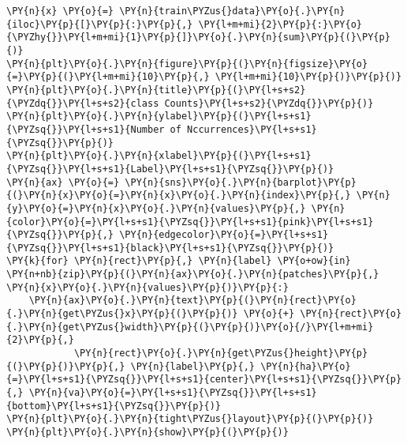 \documentclass[../main.tex]{subfiles}
\begin{document}
    \begin{tcolorbox}[breakable, size=fbox, boxrule=1pt, pad at break*=1mm,colback=cellbackground, colframe=cellborder]
\begin{Verbatim}[commandchars=\\\{\}]
\PY{n}{x} \PY{o}{=} \PY{n}{train\PYZus{}data}\PY{o}{.}\PY{n}{iloc}\PY{p}{[}\PY{p}{:}\PY{p}{,} \PY{l+m+mi}{2}\PY{p}{:}\PY{o}{\PYZhy{}}\PY{l+m+mi}{1}\PY{p}{]}\PY{o}{.}\PY{n}{sum}\PY{p}{(}\PY{p}{)}
\PY{n}{plt}\PY{o}{.}\PY{n}{figure}\PY{p}{(}\PY{n}{figsize}\PY{o}{=}\PY{p}{(}\PY{l+m+mi}{10}\PY{p}{,} \PY{l+m+mi}{10}\PY{p}{)}\PY{p}{)}
\PY{n}{plt}\PY{o}{.}\PY{n}{title}\PY{p}{(}\PY{l+s+s2}{\PYZdq{}}\PY{l+s+s2}{class Counts}\PY{l+s+s2}{\PYZdq{}}\PY{p}{)}
\PY{n}{plt}\PY{o}{.}\PY{n}{ylabel}\PY{p}{(}\PY{l+s+s1}{\PYZsq{}}\PY{l+s+s1}{Number of Nccurrences}\PY{l+s+s1}{\PYZsq{}}\PY{p}{)}
\PY{n}{plt}\PY{o}{.}\PY{n}{xlabel}\PY{p}{(}\PY{l+s+s1}{\PYZsq{}}\PY{l+s+s1}{Label}\PY{l+s+s1}{\PYZsq{}}\PY{p}{)}
\PY{n}{ax} \PY{o}{=} \PY{n}{sns}\PY{o}{.}\PY{n}{barplot}\PY{p}{(}\PY{n}{x}\PY{o}{=}\PY{n}{x}\PY{o}{.}\PY{n}{index}\PY{p}{,} \PY{n}{y}\PY{o}{=}\PY{n}{x}\PY{o}{.}\PY{n}{values}\PY{p}{,} \PY{n}{color}\PY{o}{=}\PY{l+s+s1}{\PYZsq{}}\PY{l+s+s1}{pink}\PY{l+s+s1}{\PYZsq{}}\PY{p}{,} \PY{n}{edgecolor}\PY{o}{=}\PY{l+s+s1}{\PYZsq{}}\PY{l+s+s1}{black}\PY{l+s+s1}{\PYZsq{}}\PY{p}{)}
\PY{k}{for} \PY{n}{rect}\PY{p}{,} \PY{n}{label} \PY{o+ow}{in} \PY{n+nb}{zip}\PY{p}{(}\PY{n}{ax}\PY{o}{.}\PY{n}{patches}\PY{p}{,} \PY{n}{x}\PY{o}{.}\PY{n}{values}\PY{p}{)}\PY{p}{:}
    \PY{n}{ax}\PY{o}{.}\PY{n}{text}\PY{p}{(}\PY{n}{rect}\PY{o}{.}\PY{n}{get\PYZus{}x}\PY{p}{(}\PY{p}{)} \PY{o}{+} \PY{n}{rect}\PY{o}{.}\PY{n}{get\PYZus{}width}\PY{p}{(}\PY{p}{)}\PY{o}{/}\PY{l+m+mi}{2}\PY{p}{,}
            \PY{n}{rect}\PY{o}{.}\PY{n}{get\PYZus{}height}\PY{p}{(}\PY{p}{)}\PY{p}{,} \PY{n}{label}\PY{p}{,} \PY{n}{ha}\PY{o}{=}\PY{l+s+s1}{\PYZsq{}}\PY{l+s+s1}{center}\PY{l+s+s1}{\PYZsq{}}\PY{p}{,} \PY{n}{va}\PY{o}{=}\PY{l+s+s1}{\PYZsq{}}\PY{l+s+s1}{bottom}\PY{l+s+s1}{\PYZsq{}}\PY{p}{)}
\PY{n}{plt}\PY{o}{.}\PY{n}{tight\PYZus{}layout}\PY{p}{(}\PY{p}{)}
\PY{n}{plt}\PY{o}{.}\PY{n}{show}\PY{p}{(}\PY{p}{)}
\end{Verbatim}
\end{tcolorbox}

    \begin{center}
    \end{center}
    { \hspace*{\fill} \\}
    
\end{document}
